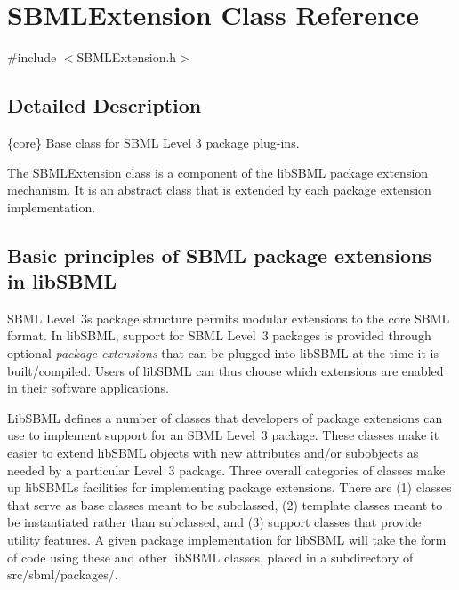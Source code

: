 \hypertarget{class_s_b_m_l_extension}{}\section{S\+B\+M\+L\+Extension Class Reference}
\label{class_s_b_m_l_extension}


{\ttfamily \#include $<$S\+B\+M\+L\+Extension.\+h$>$}



\subsection{Detailed Description}
\{core\} Base class for S\+B\+ML Level 3 package plug-\/ins.



The \hyperlink{class_s_b_m_l_extension}{S\+B\+M\+L\+Extension} class is a component of the lib\+S\+B\+ML package extension mechanism. It is an abstract class that is extended by each package extension implementation.\hypertarget{classdoc__basics__of__extensions_ext-basics}{}\subsection{Basic principles of S\+B\+M\+L package extensions in lib\+S\+B\+ML}\label{classdoc__basics__of__extensions_ext-basics}
\begin{DoxyParagraph}{}
S\+B\+ML Level~3\textquotesingle{}s package structure permits modular extensions to the core S\+B\+ML format. In lib\+S\+B\+ML, support for S\+B\+ML Level~3 packages is provided through optional {\itshape package extensions} that can be plugged into lib\+S\+B\+ML at the time it is built/compiled. Users of lib\+S\+B\+ML can thus choose which extensions are enabled in their software applications.
\end{DoxyParagraph}
Lib\+S\+B\+ML defines a number of classes that developers of package extensions can use to implement support for an S\+B\+ML Level~3 package. These classes make it easier to extend lib\+S\+B\+ML objects with new attributes and/or subobjects as needed by a particular Level~3 package. Three overall categories of classes make up lib\+S\+B\+ML\textquotesingle{}s facilities for implementing package extensions. There are (1) classes that serve as base classes meant to be subclassed, (2) template classes meant to be instantiated rather than subclassed, and (3) support classes that provide utility features. A given package implementation for lib\+S\+B\+ML will take the form of code using these and other lib\+S\+B\+ML classes, placed in a subdirectory of {\ttfamily src/sbml/packages/}.

